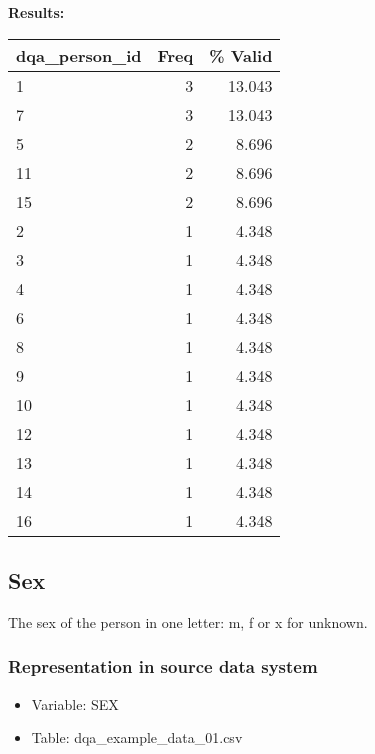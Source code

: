 \documentclass[
]{article}
\providecommand{\tightlist}{%
  \setlength{\itemsep}{0pt}\setlength{\parskip}{0pt}}
\begin{document}
\textbf{Results:}\\

\begin{table}[H]
\centering
\begin{tabular}{l|r|r}
\hline
\textbf{dqa\_person\_id} & \textbf{Freq} & \textbf{\% Valid}\\
\hline
1 & 3 & 13.043\\
\hline
7 & 3 & 13.043\\
\hline
5 & 2 & 8.696\\
\hline
11 & 2 & 8.696\\
\hline
15 & 2 & 8.696\\
\hline
2 & 1 & 4.348\\
\hline
3 & 1 & 4.348\\
\hline
4 & 1 & 4.348\\
\hline
6 & 1 & 4.348\\
\hline
8 & 1 & 4.348\\
\hline
9 & 1 & 4.348\\
\hline
10 & 1 & 4.348\\
\hline
12 & 1 & 4.348\\
\hline
13 & 1 & 4.348\\
\hline
14 & 1 & 4.348\\
\hline
16 & 1 & 4.348\\
\hline
\end{tabular}
\end{table}
\newpage

\hypertarget{sex}{%
\subsection{Sex}\label{sex}}

The sex of the person in one letter: m, f or x for unknown.

\hypertarget{representation-in-source-data-system-11}{%
\subsubsection{\texorpdfstring{Representation in \textbf{source} data
system}{Representation in source data system}}\label{representation-in-source-data-system-11}}

\begin{itemize}
\tightlist
\item
  Variable: SEX
\item
  Table: dqa\_example\_data\_01.csv
\end{itemize}
\end{document}
